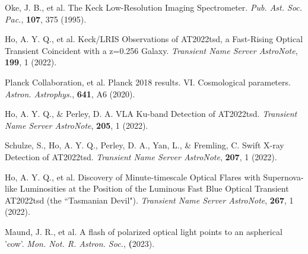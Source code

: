 \documentclass{nature_plusfigure}
\newcommand{\mn}{{Mon. Not. R. Astron. Soc.}}
\newcommand{\mnras}{\mn}
\newcommand{\aap}{{Astron. Astrophys.}}
\newcommand{\pasp}{{Pub. Ast. Soc. Pac.}}
\newcommand{\at}{AT2022tsd}
\begin{document}
\begin{thebibliography}{100}
 Oke, J. B., et al. The Keck Low-Resolution Imaging Spectrometer. \emph{\pasp}, \textbf{107}, 375 (1995). 

 Ho, A. Y. Q., et al. Keck/LRIS Observations of AT2022tsd, a Fast-Rising Optical Transient Coincident with a z=0.256 Galaxy. \emph{Transient Name Server AstroNote}, \textbf{199}, 1 (2022). 

 Planck Collaboration, et al. Planck 2018 results. VI. Cosmological parameters. \emph{\aap}, \textbf{641}, A6 (2020). 

 Ho, A. Y. Q., \& Perley, D. A. VLA Ku-band Detection of AT2022tsd. \emph{Transient Name Server AstroNote}, \textbf{205}, 1 (2022). 

 Schulze, S., Ho, A. Y. Q., Perley, D. A., Yan, L., \& Fremling, C. Swift X-ray Detection of AT2022tsd. \emph{Transient Name Server AstroNote}, \textbf{207}, 1 (2022). 

 Ho, A. Y. Q., et al. Discovery of Minute-timescale Optical Flares with Supernova-like Luminosities at the Position of the Luminous Fast Blue Optical Transient AT2022tsd (the ``Tasmanian Devil"). \emph{Transient Name Server AstroNote}, \textbf{267}, 1 (2022). 

 Maund, J. R., et al. A flash of polarized optical light points to an aspherical 'cow'. \emph{\mnras}, \textbf (2023). 


\end{thebibliography}


\end{document}

